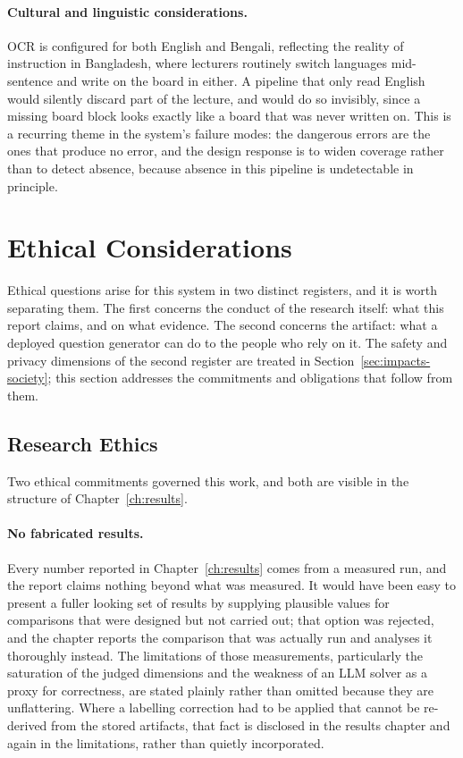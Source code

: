 \paragraph{Cultural and linguistic considerations.} OCR is configured for both
English and Bengali, reflecting the reality of instruction in Bangladesh, where
lecturers routinely switch languages mid-sentence and write on the board in either.
A pipeline that only read English would silently discard part of the lecture, and
would do so invisibly, since a missing board block looks exactly like a board that
was never written on. This is a recurring theme in the system's failure modes: the
dangerous errors are the ones that produce no error, and the design response is to
widen coverage rather than to detect absence, because absence in this pipeline is
undetectable in principle.

\section{Ethical Considerations}
\label{sec:impacts-ethics}

Ethical questions arise for this system in two distinct registers, and it is
worth separating them. The first concerns the conduct of the research itself:
what this report claims, and on what evidence. The second concerns the artifact:
what a deployed question generator can do to the people who rely on it. The
safety and privacy dimensions of the second register are treated in
Section~\ref{sec:impacts-society}; this section addresses the commitments and
obligations that follow from them.

\subsection{Research Ethics}

Two ethical commitments governed this work, and both are visible in the
structure of Chapter~\ref{ch:results}.

\paragraph{No fabricated results.} Every number reported in
Chapter~\ref{ch:results} comes from a measured run, and the report claims
nothing beyond what was measured. It would have been easy to present a fuller
looking set of results by supplying plausible values for comparisons that were
designed but not carried out; that option was rejected, and the chapter reports
the comparison that was actually run and analyses it thoroughly instead. The
limitations of those measurements, particularly the saturation of the judged
dimensions and the weakness of an LLM solver as a proxy for correctness, are
stated plainly rather than omitted because they are unflattering. Where a labelling correction had to be applied
that cannot be re-derived from the stored artifacts, that fact is disclosed in
the results chapter and again in the limitations, rather than quietly
incorporated.

